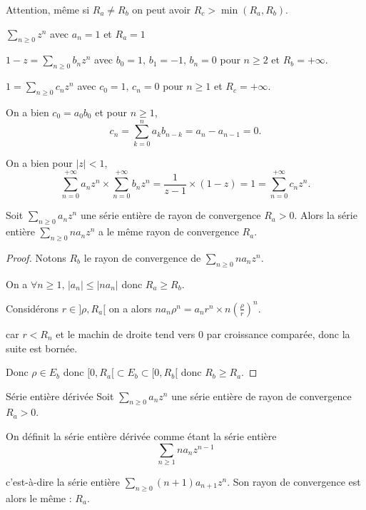 \begin{remarque}
    Attention, même si $R_a \neq R_b$ on peut avoir $R_c > \min(R_a, R_b)$.
\end{remarque}

\begin{exemple}
    $\sum_{n \geqslant 0 } z^n$ avec $a_n = 1$ et $R_a = 1$

    $1 - z = \sum_{n \geqslant 0} b_n z^n$ avec $b_0 = 1, \, b_1 = -1, \, b_n = 0$ pour $n \geqslant 2$ et $R_b = +\infty$.

    $1 = \sum_{n \geqslant 0 } c_n z^n$ avec $c_0 = 1, \, c_n = 0$ pour $n \geqslant 1$ et $R_c = +\infty$.

    On a bien $c_0 = a_0 b_0$ et pour $n \geqslant 1$, 
    \[
        c_n = \sum_{k = 0}^n a_k b_{n - k} = a_n - a_{n - 1} = 0.
    \]

    On a bien pour $|z| < 1$,
    \[
        \sum_{n = 0}^{+\infty} a_n z^n \times \sum_{n = 0 }^{+ \infty } b_n z^n= \frac 1 {z - 1} \times (1 - z) = 1 = \sum_{n = 0}^{+\infty} c_n z^n.
    \]
\end{exemple}


\begin{proposition}{}{}
    Soit $\sum_{n \geqslant 0} a_n z^n$ une série entière de rayon de convergence $R_a > 0$.
    Alors la série entière $\sum_{n \geqslant 0} n a_n z^n$ a le même rayon de convergence $R_a$.
\end{proposition}

\begin{proof}
    Notons $R_b$ le rayon de convergence de $\sum_{n \geqslant 0} n a_n z^n$.

    On a $\forall n \geqslant 1, \, |a_n| \leqslant |n a_n|$ donc $R_a \geqslant R_b$.


    Considérons $r \in ]\rho, R_a[$ on a alors $n a_n \rho^n = a_n r^n \times n \left( \frac \rho r \right)^n$.

    car $r < R_n$ et le machin de droite tend vers 0 par croissance comparée, donc la suite est bornée. 

    Donc $\rho \in E_b$ donc $[0, R_a [ \subset E_b  \subset [0, R_b[$ donc $R_b \geqslant R_a$.
\end{proof}

\begin{definition}{Série entière dérivée}{}
    Soit $\sum_{n \geqslant 0 } a_n z^n$ une série entière de rayon de convergence $R_a > 0$.

    On définit la série entière dérivée comme étant la série entière
    $$\sum_{n \geqslant 1} n a_n z^{ n - 1 }$$

    c'est-à-dire la série entière $\sum_{n \geqslant 0} (n + 1) a_{n + 1} z^n$. Son rayon de 
    convergence est alors le même : $R_a$. 
\end{definition}

